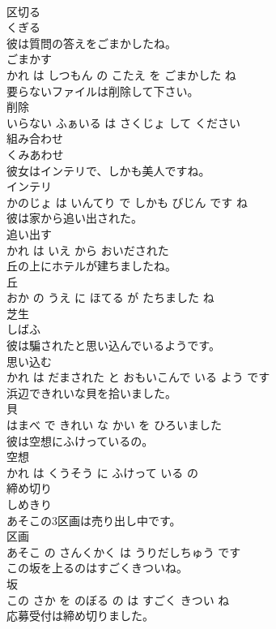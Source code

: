 \documentclass[8pt]{extreport}
\begin{document}
\begin{CJK}{UTF8}{min}
\\	区切る	
\\	くぎる			
\\	彼は質問の答えをごまかしたね。	
\\	ごまかす 
\\	かれ は しつもん の こたえ を ごまかした ね			
\\	要らないファイルは削除して下さい。	
\\	削除 
\\	いらない ふぁいる は さくじょ して ください			
\\	組み合わせ	
\\	くみあわせ			
\\	彼女はインテリで、しかも美人ですね。	
\\	インテリ 
\\	かのじょ は いんてり で しかも びじん です ね			
\\	彼は家から追い出された。	
\\	追い出す 
\\	かれ は いえ から おいだされた			
\\	丘の上にホテルが建ちましたね。	
\\	丘 
\\	おか の うえ に ほてる が たちました ね			
\\	芝生	
\\	しばふ			
\\	彼は騙されたと思い込んでいるようです。	
\\	思い込む 
\\	かれ は だまされた と おもいこんで いる よう です			
\\	浜辺できれいな貝を拾いました。	
\\	貝 
\\	はまべ で きれい な かい を ひろいました			
\\	彼は空想にふけっているの。	
\\	空想 
\\	かれ は くうそう に ふけって いる の			
\\	締め切り	
\\	しめきり			
\\	あそこの3区画は売り出し中です。	
\\	区画 
\\	あそこ の さんくかく は うりだしちゅう です			
\\	この坂を上るのはすごくきついね。	
\\	坂 
\\	この さか を のぼる の は すごく きつい ね			
\\	応募受付は締め切りました。	

\end{CJK}
\end{document}
